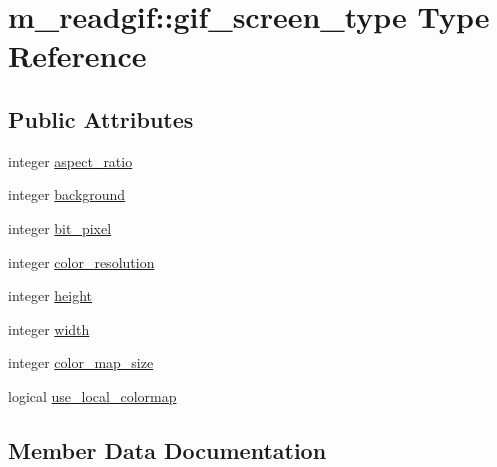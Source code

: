 \hypertarget{structm__readgif_1_1gif__screen__type}{}\section{m\+\_\+readgif\+:\+:gif\+\_\+screen\+\_\+type Type Reference}
\label{structm__readgif_1_1gif__screen__type}
\subsection*{Public Attributes}
\begin{DoxyCompactItemize}
\item 
integer \mbox{\hyperlink{structm__readgif_1_1gif__screen__type_ab6ae805198c2ec45439be3be1b6f1b98}{aspect\+\_\+ratio}}
\item 
integer \mbox{\hyperlink{structm__readgif_1_1gif__screen__type_a4a31d71ea239de86a385139081f941ba}{background}}
\item 
integer \mbox{\hyperlink{structm__readgif_1_1gif__screen__type_aabb35d3c3029216c0fc92275be788107}{bit\+\_\+pixel}}
\item 
integer \mbox{\hyperlink{structm__readgif_1_1gif__screen__type_ab658d452e13761e1df0ca41584b3473e}{color\+\_\+resolution}}
\item 
integer \mbox{\hyperlink{structm__readgif_1_1gif__screen__type_a98828d2f71961cdc398ec567846e9da4}{height}}
\item 
integer \mbox{\hyperlink{structm__readgif_1_1gif__screen__type_adea440e7648df26d475a1c1531108a29}{width}}
\item 
integer \mbox{\hyperlink{structm__readgif_1_1gif__screen__type_a42c5ab97168acf1f1b9fef9f86fc5393}{color\+\_\+map\+\_\+size}}
\item 
logical \mbox{\hyperlink{structm__readgif_1_1gif__screen__type_af6ecd153af2e29d040055fa6dd92c671}{use\+\_\+local\+\_\+colormap}}
\end{DoxyCompactItemize}


\subsection{Member Data Documentation}
\mbox{\label{structm__readgif_1_1gif__screen__type_ab6ae805198c2ec45439be3be1b6f1b98}} 
